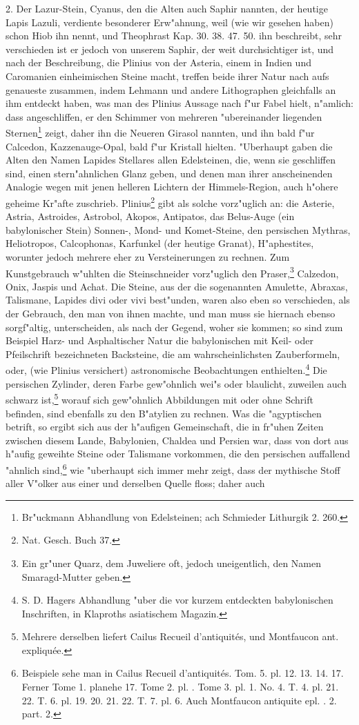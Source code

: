 \documentclass[a4paper, 11pt, oneside, polutonikogreek, german]{article}
\begin{document}
2. Der Lazur-Stein, Cyanus, den die Alten auch Saphir nannten, der heutige Lapis Lazuli, verdiente besonderer Erw"ahnung, weil (wie wir gesehen haben) schon Hiob ihn nennt, und Theophrast Kap. 30. 38. 47. 50. ihn beschreibt, sehr verschieden ist er jedoch von unserem Saphir, der weit durchsichtiger ist, und nach der Beschreibung, die Plinius von der Asteria, einem in Indien und Caromanien einheimischen Steine macht, treffen beide ihrer Natur nach aufs genaueste zusammen, indem Lehmann und andere Lithographen gleichfalls an ihm entdeckt haben, was man des Plinius Aussage nach f"ur Fabel hielt, n"amlich: dass angeschliffen, er den Schimmer von mehreren "ubereinander liegenden Sternen\footnote{Br"uckmann Abhandlung von Edelsteinen; ach Schmieder Lithurgik 2. 260.} zeigt, daher ihn die Neueren Girasol nannten, und ihn bald f"ur Calcedon, Kazzenauge-Opal, bald f"ur Kristall hielten. "Uberhaupt gaben die Alten den Namen Lapides Stellares allen Edelsteinen, die, wenn sie geschliffen sind, einen stern"ahnlichen Glanz geben, und denen man ihrer anscheinenden Analogie wegen mit jenen helleren Lichtern der Himmels-Region, auch h"ohere geheime Kr"afte zuschrieb. Plinius\footnote{Nat. Gesch. Buch 37.} gibt als solche vorz"uglich an: die Asterie, Astria, Astroides, Astrobol, Akopos, Antipatos, das Belus-Auge (ein babylonischer Stein) Sonnen-, Mond- und Komet-Steine, den persischen Mythras, Heliotropos, Calcophonas, Karfunkel (der heutige Granat), H"aphestites, worunter jedoch mehrere eher zu Versteinerungen zu rechnen. Zum Kunstgebrauch w"uhlten die Steinschneider vorz"uglich den Praser,\footnote{Ein gr"uner Quarz, dem Juweliere oft, jedoch uneigentlich, den Namen Smaragd-Mutter geben.} Calzedon, Onix, Jaspis und Achat. Die Steine, aus der die sogenannten Amulette, Abraxas, Talismane, Lapides divi oder vivi best"unden, waren also eben so verschieden, als der Gebrauch, den man von ihnen machte, und man muss sie hiernach ebenso sorgf"altig, unterscheiden, als nach der Gegend, woher sie kommen; so sind zum Beispiel Harz- und Asphaltischer Natur die babylonischen mit Keil- oder Pfeilschrift bezeichneten Backsteine, die am wahrscheinlichsten Zauberformeln, oder, (wie Plinius versichert) astronomische Beobachtungen enthielten.\footnote{S. D. Hagers Abhandlung "uber die vor kurzem entdeckten babylonischen Inschriften, in Klaproths asiatischem Magazin.} Die persischen Zylinder, deren Farbe gew"ohnlich wei"s oder blaulicht, zuweilen auch schwarz ist,\footnote{Mehrere derselben liefert Cailus Recueil d'antiquités, und Montfaucon ant. expliquée.} worauf sich gew"ohnlich Abbildungen mit oder ohne Schrift befinden, sind ebenfalls zu den B"atylien zu rechnen. Was die "agyptischen betrift, so ergibt sich aus der h"aufigen Gemeinschaft, die in fr"uhen Zeiten zwischen diesem Lande, Babylonien, Chaldea und Persien war, dass von dort aus h"aufig geweihte Steine oder Talismane vorkommen, die den persischen auffallend "ahnlich sind,\footnote{Beispiele sehe man in Cailus Recueil d'antiquités. Tom. 5. pl. 12. 13. 14. 17. Ferner Tome 1. planehe 17. Tome 2. pl. . Tome 3. pl. 1. No. 4. T. 4. pl. 21. 22. T. 6. pl. 19. 20. 21. 22. T. 7. pl. 6. Auch Montfaucon antiquite epl. . 2. part. 2.} wie "uberhaupt sich immer mehr zeigt, dass der mythische Stoff aller V"olker aus einer und derselben Quelle floss; daher auch 
\end{document}

